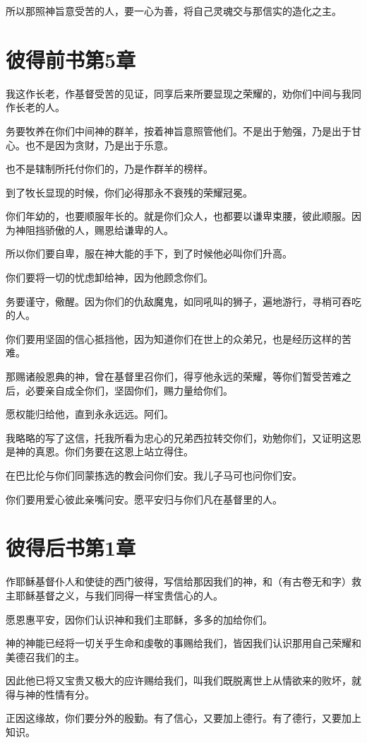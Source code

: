 \documentclass[12pt,oneside]{book}
\begin{document}
所以那照神旨意受苦的人，要一心为善，将自己灵魂交与那信实的造化之主。

\chapter{彼得前书第5章}
我这作长老，作基督受苦的见证，同享后来所要显现之荣耀的，劝你们中间与我同作长老的人。

务要牧养在你们中间神的群羊，按着神旨意照管他们。不是出于勉强，乃是出于甘心。也不是因为贪财，乃是出于乐意。

也不是辖制所托付你们的，乃是作群羊的榜样。

到了牧长显现的时候，你们必得那永不衰残的荣耀冠冕。

你们年幼的，也要顺服年长的。就是你们众人，也都要以谦卑束腰，彼此顺服。因为神阻挡骄傲的人，赐恩给谦卑的人。

所以你们要自卑，服在神大能的手下，到了时候他必叫你们升高。

你们要将一切的忧虑卸给神，因为他顾念你们。

务要谨守，儆醒。因为你们的仇敌魔鬼，如同吼叫的狮子，遍地游行，寻梢可吞吃的人。

你们要用坚固的信心抵挡他，因为知道你们在世上的众弟兄，也是经历这样的苦难。

那赐诸般恩典的神，曾在基督里召你们，得亨他永远的荣耀，等你们暂受苦难之后，必要亲自成全你们，坚固你们，赐力量给你们。

愿权能归给他，直到永永远远。阿们。

我略略的写了这信，托我所看为忠心的兄弟西拉转交你们，劝勉你们，又证明这恩是神的真恩。你们务要在这恩上站立得住。

在巴比伦与你们同蒙拣选的教会问你们安。我儿子马可也问你们安。

你们要用爱心彼此亲嘴问安。愿平安归与你们凡在基督里的人。

\chapter{彼得后书第1章}
作耶稣基督仆人和使徒的西门彼得，写信给那因我们的神，和（有古卷无和字）救主耶稣基督之义，与我们同得一样宝贵信心的人。

愿恩惠平安，因你们认识神和我们主耶稣，多多的加给你们。

神的神能已经将一切关乎生命和虔敬的事赐给我们，皆因我们认识那用自己荣耀和美德召我们的主。

因此他已将又宝贵又极大的应许赐给我们，叫我们既脱离世上从情欲来的败坏，就得与神的性情有分。

正因这缘故，你们要分外的殷勤。有了信心，又要加上德行。有了德行，又要加上知识。
\end{document}
